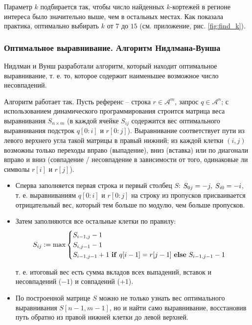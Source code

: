 \documentclass{main.tex}[subfiles]
\begin{document}
Параметр $k$ подбирается так, чтобы число найденных $k$-кортежей в регионе интереса было значительно выше, чем в остальных местах.
Как показала практика, оптимально выбирать $k$ от $7$ до $15$ (см. приложение, рис. \ref{fig:find_k}).

\subsubsection{Оптимальное выравнивание. Алгоритм Нидлмана-Вунша}

Нидлман и Вунш \cite{needleman1970} разработали алгоритм, который находит оптимальное выравнивание, т. е. то, которое содержит наименьшее возможное число несовпадений.

Алгоритм работает так.
Пусть референс -- строка $r \in \mathcal{A}^m $, запрос $q \in \mathcal{A}^n$; с использованием динамического программирования строится матрица веса выравнивания $S_{n\times m}$ (в каждой ячейке $S_{ij}$ содержится вес оптимального выравнивания подстрок $q[0:i]$ и $r[0:j]$). %
Выравнивание соответствует пути из левого верхнего угла такой матрицы в правый нижний; из каждой клетки $(i,j)$ возможны только переходы вправо (выпадение), вниз (вставка) или по диагонали вправо и вниз (совпадение / несовпадение в зависимости от того, одинаковые ли символы $r[i]$ и $r[j]$).
\begin{itemize}
    \item Сперва заполняется первая строка и первый столбец $S$: $S_{0j} = -j, \thickspace S_{i0} = -i$, т. е. выравниваниям $q[0:i]$ и  $r[0:j]$ на строку из пропусков присваивается отрицательный вес, который тем больше по модулю, чем больше пропусков.
    \item Затем заполняются все остальные клетки по правилу:
    \[ S_{ij} := \max \begin{cases}
        S_{i-1,j} - 1 \\
        S_{i,j-1} - 1 \\
        S_{i-1,j-1} + 1 \text{ \textbf{if} } q[i-1] = r[j-1] \text{ \textbf{else} } S_{i-1,j-1} - 1
    \end{cases} \]

    т. е. итоговый вес есть сумма вкладов всех выпадений, вставок и несовпадений ($-1$) и совпадений ($+1$).
    \item По построенной матрице $ S $ можно не только узнать вес оптимального выравнивания $S[n-1,m-1]$, но и найти само выравнивание, восстановив путь обратно из правой нижней клетки до левой верхней.

\end{itemize}
\end{document}
